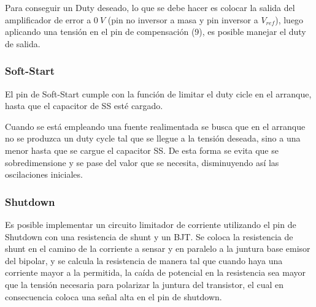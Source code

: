 Para conseguir un Duty deseado, lo que se debe hacer es colocar la salida del amplificador de error a $0 \ V$ (pin no inversor a masa y pin inversor a $V_{ref}$), luego aplicando una tensión en el pin de compensación (9), es posible manejar el duty de salida. 

\subsubsection{Soft-Start}

El pin de Soft-Start cumple con la función de limitar el duty cicle en el arranque, hasta que el capacitor de SS esté cargado. %

Cuando se está empleando una fuente realimentada se busca que en el arranque no se produzca un duty cycle tal que se llegue a la tensión deseada, sino a una menor hasta que se cargue el capacitor SS. De esta forma se evita que se sobredimensione y se pase del valor que se necesita, disminuyendo así las oscilaciones iniciales.


\subsubsection{Shutdown}

Es posible implementar un circuito limitador de corriente utilizando el pin de Shutdown con una resistencia de shunt y un BJT. Se coloca la resistencia de shunt en el camino de la corriente a sensar y en paralelo a la juntura base emisor del bipolar, y se calcula la resistencia de manera tal que cuando haya una corriente mayor a la permitida, la caída de potencial en la resistencia sea mayor que la tensión necesaria para polarizar la juntura del transistor, el cual en consecuencia coloca una señal alta en el pin de shutdown.

%